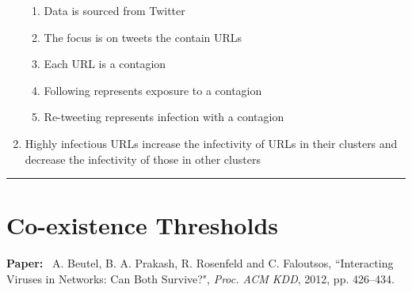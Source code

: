 \documentclass[11pt]{article}
\begin{document}
\begin{enumerate}
    \begin{enumerate}
        \item Data is sourced from Twitter
        \item The focus is on tweets the contain URLs
        \item Each URL is a contagion
        \item Following represents exposure to a contagion
        \item Re-tweeting represents infection with a contagion
    \end{enumerate}
    \item Highly infectious URLs increase the infectivity of URLs in their clusters and decrease the infectivity of those in other clusters
    
\end{enumerate}
\noindent
\rule{\textwidth}{0.01in}

\clearpage


\section{Co-existence Thresholds}

\noindent
\textbf{Paper:}~  
A. Beutel, B. A. Prakash, R. Rosenfeld and C. Faloutsos,
``Interacting Viruses in Networks: Can Both Survive?",
\emph{Proc. ACM KDD}, 2012, pp. 426--434.
\end{document}
